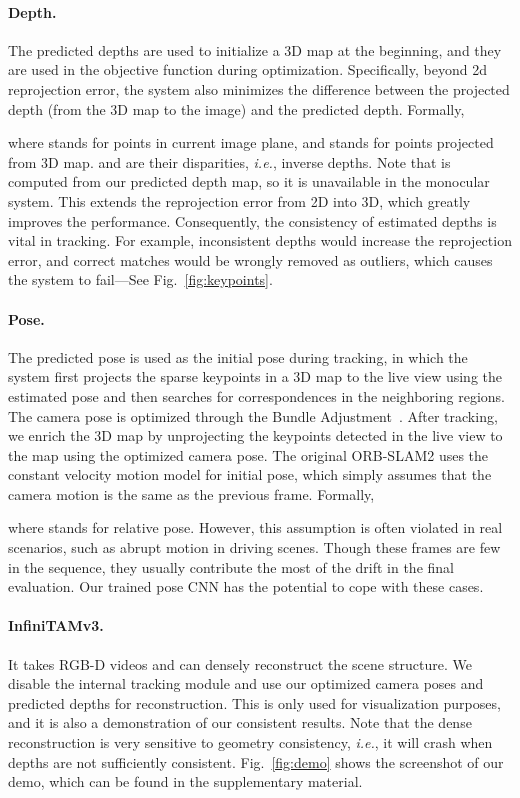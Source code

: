 \documentclass[twocolumn]{svjour3}
\renewcommand{\cite}[1]{\textcolor{blue}{\citep{#1}}}
\def\ie{\emph{i.e.}}
\newcommand{\figref}[1]{Fig.~\ref{#1}}
\begin{document}
\paragraph{Depth.} 
The predicted depths are used to initialize a 3D map at the beginning, 
and they are used in the objective function during optimization.
Specifically, beyond 2d reprojection error, 
the system also minimizes the difference between the projected depth (from the 3D map to the image) and the predicted depth.
Formally,

where  stands for points in current image plane,
and  stands for points projected from 3D map.
 and  are their disparities, \ie, inverse depths.
Note that  is computed from our predicted depth map, so it is unavailable in the monocular system.
This extends the reprojection error from 2D into 3D, 
which greatly improves the performance. 
Consequently, the consistency of estimated depths is vital in tracking.
For example, inconsistent depths would increase the reprojection error, 
and correct matches would be wrongly removed as outliers,
which causes the system to fail---See \figref{fig:keypoints}.



\paragraph{Pose.} 
The predicted pose is used as the initial pose during tracking,
in which the system first projects the sparse keypoints in a 3D map 
to the live view using the estimated pose and 
then searches for correspondences in the neighboring regions.
The camera pose is optimized through the Bundle Adjustment~\cite{murORB2}.
After tracking, we enrich the 3D map by unprojecting the keypoints detected in 
the live view to the map using the optimized camera pose.
The original ORB-SLAM2 uses the constant velocity motion model for 
initial pose, 
which simply assumes that the camera motion is the same as the previous frame.
Formally,

where  stands for relative pose.
However, this assumption is often violated in real scenarios, 
such as abrupt motion in driving scenes.
Though these frames are few in the sequence, 
they usually contribute the most of the drift in the final evaluation. 
Our trained pose CNN has the potential to cope with these cases.

\paragraph{InfiniTAMv3.}
It takes RGB-D videos and can densely reconstruct the scene structure.
We disable the internal tracking module and use our optimized 
camera poses and predicted depths for reconstruction.
This is only used for visualization purposes,
and it is also a demonstration of our consistent results.
Note that the dense reconstruction is very sensitive to geometry consistency,
\ie, it will crash when depths are not sufficiently consistent.
\figref{fig:demo} shows the screenshot of our demo,
which can be found in the supplementary material.
\end{document}
